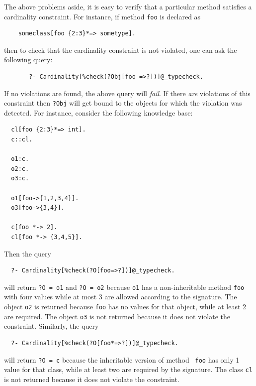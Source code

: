 \documentclass[11pt]{article}
\begin{document}
The above problems aside, it is easy to verify that a particular
method satisfies a cardinality constraint.
For instance, if method {\tt foo} is declared as 
\begin{verbatim}
    someclass[foo {2:3}*=> sometype].
\end{verbatim}
then to check that the cardinality constraint is not violated,
one can ask the following query:
\begin{verbatim}
       ?- Cardinality[%check(?Obj[foo =>?])]@_typecheck.
\end{verbatim}
If no violations are found, the above query will \emph{fail}. 
If there \emph{are} violations of this constraint then {\tt ?Obj} will get bound
to the objects for which the violation was detected. For instance, consider
the following knowledge base:
\begin{verbatim}
  cl[foo {2:3}*=> int].
  c::cl.

  o1:c.
  o2:c.
  o3:c.

  o1[foo->{1,2,3,4}].
  o3[foo->{3,4}].

  c[foo *-> 2].
  cl[foo *-> {3,4,5}].
\end{verbatim}
Then the query
\begin{verbatim}
  ?- Cardinality[%check(?O[foo=>?])]@_typecheck.
\end{verbatim}
will return {\tt ?O = o1} and {\tt ?O = o2} because {\tt o1} has a
non-inheritable method {\tt foo} with four values while at most 3 are
allowed according to the signature. The object {\tt o2} is returned because
{\tt foo} has no values for that object, while at least 2 are required.
The object {\tt o3} is not returned
because it does not violate the constraint.  Similarly, the query
\begin{verbatim}
  ?- Cardinality[%check(?O[foo*=>?])]@_typecheck.
\end{verbatim}
will return {\tt ?O = c} because the inheritable version of method {\tt
  foo} has only 1 value for that class, while at least two are required by
the signature.  The class {\tt cl} is not returned because it does not
violate the constraint.
\end{document}
